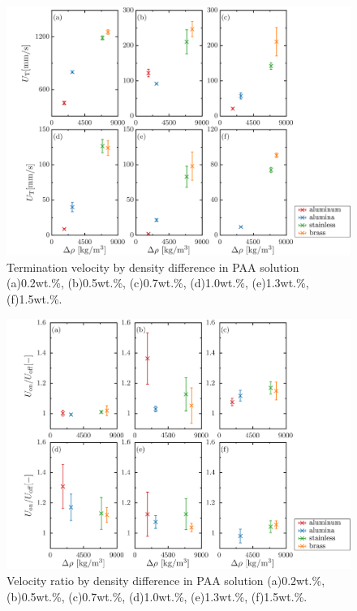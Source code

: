 \begin{figure}[ht]
    \centering
    \includegraphics[width=1.0\textwidth]{./5-Results/density/rhoUT.png}
    \caption{Termination velocity by density difference in PAA solution (a)0.2wt.\%, (b)0.5wt.\%, (c)0.7wt.\%, (d)1.0wt.\%, (e)1.3wt.\%, (f)1.5wt.\%.}
    \label{fig:rhoUT}
\end{figure}

\begin{figure}[ht]
    \centering
    \includegraphics[width=1.0\textwidth]{./5-Results/density/rhoUdiff.png}
    \caption{Velocity ratio by density difference in PAA solution (a)0.2wt.\%, (b)0.5wt.\%, (c)0.7wt.\%, (d)1.0wt.\%, (e)1.3wt.\%, (f)1.5wt.\%.}
    \label{fig:rhoUdiff}
\end{figure}

